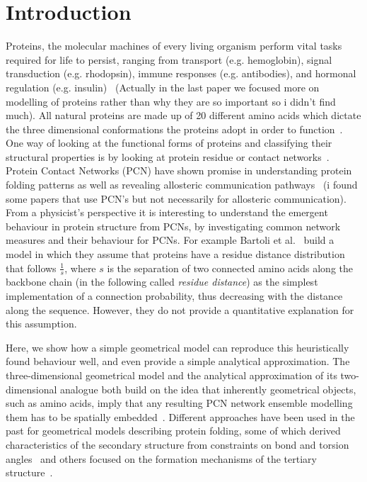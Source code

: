 \documentclass[
reprint,
twocolumn,
amsmath,amssymb,superscriptaddress,aps,
pre]{revtex4-1}
\newcommand{\red}[1]{\textcolor{red!80!black}{#1}}
\newcommand{\blue}[1]{\textcolor{blue!80!black}{#1}}
\begin{document}
\section*{Introduction}
Proteins, the molecular machines of every living organism perform vital tasks required for life to persist, ranging from transport (e.g. hemoglobin), signal transduction (e.g. rhodopsin), immune responses (e.g. antibodies), and hormonal regulation (e.g. insulin)~\cite{dill2008protein,Dill1042} \red{(Actually in the last paper we focused more on modelling of proteins rather than why they are so important so i didn't find much)}. All natural proteins are made up of 20 different amino acids which dictate the three dimensional conformations the proteins adopt in order to function~\cite{scheraga2007protein}. One way of looking at the functional forms of proteins and classifying their structural properties is by looking at protein residue or contact networks~\cite{Vendruscolo2002,DiPaola2013,Estrada2011}. Protein Contact Networks (PCN) have shown promise in understanding protein folding patterns as well as revealing allosteric communication pathways~\cite{yao2019establishing, menichetti2016network,dokholyan2002topological} \red{(i found some papers that use PCN's but not necessarily for allosteric communication)}. 
From a physicist's perspective it is interesting to understand the emergent behaviour in protein structure from PCNs, by investigating common network measures and their behaviour for PCNs. For example Bartoli et al.~\cite{bartoli2008effect} build a model in which they assume that proteins have a residue distance distribution that follows $\frac{1}{s}$, where $s$ is the separation of two connected amino acids along the backbone chain (in the following called \emph{residue distance}) as the simplest implementation of a connection probability, thus decreasing with the distance along the sequence. However, they do not provide a quantitative explanation for this assumption. 

Here, we show how a simple geometrical model can reproduce this heuristically found behaviour well, and even provide a simple analytical approximation. \blue{The three-dimensional geometrical model and the analytical approximation of its two-dimensional analogue both} build on the idea that inherently geometrical objects, such as amino acids, imply that any resulting PCN network ensemble modelling them has to be spatially embedded~\cite{molkenthin2016scaling, molkenthin2020self}. 
Different approaches have been used in the past for geometrical models describing protein folding, some of which derived characteristics of the secondary structure from constraints on bond and torsion angles~\cite{bhattacharjee2013flory,Danielsson2010,Molkenthin2011} and others focused on the formation mechanisms of the tertiary structure~\cite{molkenthin2016scaling, molkenthin2020self}. 
\end{document}
